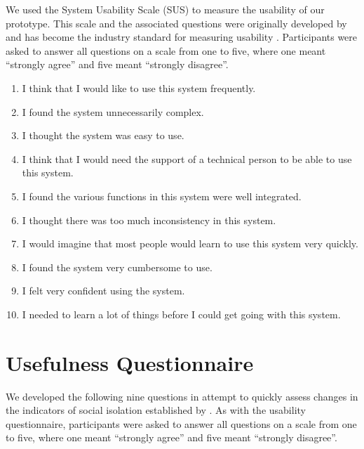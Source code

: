 We used the System Usability Scale (SUS) to measure the usability of our prototype. This scale and the associated questions were originally developed by \cite{brooke_sus_1996} and has become the industry standard for measuring usability \cite{bangor_empirical_2008}. Participants were asked to answer all questions on a scale from one to five, where one meant ``strongly agree'' and five meant ``strongly disagree''.

\begin{enumerate}
    \item I think that I would like to use this system frequently.
    \item I found the system unnecessarily complex.
    \item I thought the system was easy to use.
    \item I think that I would need the support of a technical person to be able to use this system.
    \item I found the various functions in this system were well integrated.
    \item I thought there was too much inconsistency in this system.
    \item I would imagine that most people would learn to use this system very quickly.
    \item I found the system very cumbersome to use.
    \item I felt very confident using the system.
    \item I needed to learn a lot of things before I could get going with this system.
\end{enumerate}




\section{Usefulness Questionnaire}
\label{app:questionnaires-usefulness}

We developed the following nine questions in attempt to quickly assess changes in the indicators of social isolation established by . As with the usability questionnaire, participants were asked to answer all questions on a scale from one to five, where one meant ``strongly agree'' and five meant ``strongly disagree''.

